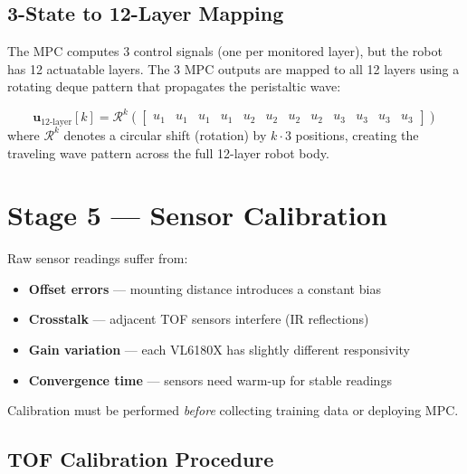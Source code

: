 \documentclass[11pt,a4paper]{article}
\begin{document}
\subsection{3-State to 12-Layer Mapping}

The MPC computes 3 control signals (one per monitored layer), but the robot has
12 actuatable layers. The 3 MPC outputs are mapped to all 12 layers using a
rotating deque pattern that propagates the peristaltic wave:

\begin{equationbox}
\begin{equation}
    \mathbf{u}_{\text{12-layer}}[k] = \mathcal{R}^k\!\left(\begin{bmatrix}
        u_1 & u_1 & u_1 & u_1 & u_2 & u_2 & u_2 & u_2 & u_3 & u_3 & u_3 & u_3
    \end{bmatrix}\right)
    \label{eq:layer_mapping}
\end{equation}
where $\mathcal{R}^k$ denotes a circular shift (rotation) by $k \cdot 3$ positions,
creating the traveling wave pattern across the full 12-layer robot body.
\end{equationbox}

\section{Stage 5 --- Sensor Calibration}
\label{sec:calibration}

\begin{conceptbox}
Raw sensor readings suffer from:
\begin{itemize}
    \item \textbf{Offset errors} --- mounting distance introduces a constant bias
    \item \textbf{Crosstalk} --- adjacent TOF sensors interfere (IR reflections)
    \item \textbf{Gain variation} --- each VL6180X has slightly different responsivity
    \item \textbf{Convergence time} --- sensors need warm-up for stable readings
\end{itemize}
Calibration must be performed \emph{before} collecting training data or deploying MPC.
\end{conceptbox}

\subsection{TOF Calibration Procedure}
\end{document}
